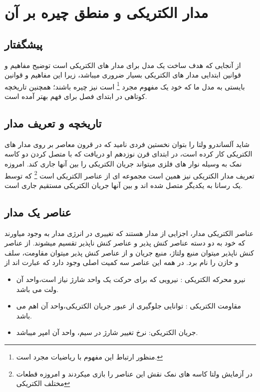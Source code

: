 \chapter{مدار الکتریکی و منطق چیره بر آن}
\section{پیشگفتار}
از آنجایی که هدف ساخت یک مدل برای مدار های الکتریکی است
توضیح مفاهیم و قوانین ابتدایی مدار های الکتریکی بسیار ضروری میباشد،
زیرا این مفاهیم و قوانین بایستی به مدل ما که خود یک مفهوم مجرد
\footnote{منظور ارتباط این مفهوم با ریاضیات مجرد
است.}
است نیز چیره باشند؛
 همچنین تاریخچه کوتاهی در ابتدای فصل برای فهم بهتر آمده است.


\section{تاریخچه و تعریف مدار}
شاید آلساندرو ولتا را بتوان نخستین فردی نامید که در قرون معاصر بر روی مدار های الکتریکی کار کرده است،
در ابتدای قرن نوزدهم او دریافت که با متصل کردن دو کاسه نمک به وسیله نوار های فلزی میتواند جریان الکتریکی را بین آنها جاری کند.
امروزه تعریف مدار الکتریکی نیز همین است مجموعه ای از عناصر الکتریکی است 
\footnote{در آزمایش ولتا کاسه های نمک نقش این عناصر را بازی میکردند
و امروزه قطعات مختلف الکتریکی}
که توسط یک رسانا به یکدیگر متصل شده اند و بین آنها جریان الکتریکی مستقیم جاری است.
\cite{Isabel20}

\section{عناصر یک مدار}
عناصر الکتریکی مدار، اجزایی از مدار هستند که تغییری در انرژی مدار به وجود میاورند که خود به دو دسته عناصر کنش پذیر و عناصر کنش ناپذیر تقسیم میشوند.
از عناصر کنش ناپذیر میتوان منبع ولتاژ، منبع جریان و از عناصر کنش پذیر میتوان مقاومت، سلف و خازن را نام برد.
در همه این عناصر سه کمیت اصلی وجود دارد که عبارت اند از
\cite{Isabel20}
\begin{itemize}
	\item
	نیرو محرکه الکتریکی : نیرویی که برای حرکت یک واحد شارژ نیاز است،واحد آن ولت می باشد.
	\item
	مقاومت الکتریکی : توانایی جلوگیری از عبور جریان الکتریکی،واحد آن اهم می باشد.
	\item
	جریان الکتریکی: نرخ تغییر شارژ در سیم، واحد آن امپر میباشد.
	
\end{itemize}


